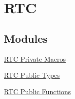 \hypertarget{group___r_t_c}{\section{\-R\-T\-C}
\label{group___r_t_c}
}
\subsection*{\-Modules}
\begin{DoxyCompactItemize}
\item 
\hyperlink{group___r_t_c___private___macros}{\-R\-T\-C Private Macros}
\item 
\hyperlink{group___r_t_c___public___types}{\-R\-T\-C Public Types}
\item 
\hyperlink{group___r_t_c___public___functions}{\-R\-T\-C Public Functions}
\end{DoxyCompactItemize}
